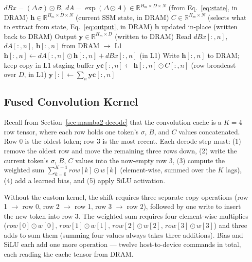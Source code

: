 \begin{algorithm}[h]
\caption{SSM update kernel (\texttt{ssm\_update})}
\label{alg:kernel}
\begin{algorithmic}[1]
\Require $\mathit{dBx} = (\Delta\,\sigma)\odot B,\ \mathit{dA} = \exp(\Delta\odot A) \in \mathbb{R}^{H_m \times D \times N}$ (from Eq.~\ref{eq:state}, in DRAM)
\Require $\mathbf{h} \in \mathbb{R}^{H_m \times D \times N}$ (current SSM state, in DRAM)
\Require $C \in \mathbb{R}^{H_m \times N}$ (selects what to extract from state, Eq.~\ref{eq:output}, in DRAM)
\Ensure  $\mathbf{h}$ updated in-place (written back to DRAM)
\Ensure  Output $\mathbf{y} \in \mathbb{R}^{H_m \times D}$ (written to DRAM)
\Statex
{}
                              
  \State Read $\mathit{dBx}[:,n]$, $\mathit{dA}[:,n]$, $\mathbf{h}[:,n]$ from DRAM $\to$ L1
  \State $\mathbf{h}[:,n] \leftarrow \mathit{dA}[:,n] \odot \mathbf{h}[:,n] + \mathit{dBx}[:,n]$ \hfill (in L1)
  \State Write $\mathbf{h}[:,n]$ to DRAM; keep copy in L1 staging buffer
\EndFor
{}                              
  \State $\mathbf{yc}[:,n] \leftarrow \mathbf{h}[:,n] \odot C[:,n]$ \hfill (row broadcast over $D$, in L1)
\EndFor
\State $\mathbf{y}[:] \leftarrow \sum_n \mathbf{yc}[:,n]$ 
\end{algorithmic}
\end{algorithm}

\subsection{Fused Convolution Kernel}
\label{sec:conv1d-kernel}

Recall from Section~\ref{sec:mamba2-decode} that the convolution cache is a $K{=}4$ row tensor, where each row holds one token's $\sigma$, $B$, and $C$ values concatenated. Row 0 is the oldest token; row 3 is the most recent. Each decode step must: (1) remove the oldest row and move the remaining three rows down, (2) write the current token's $\sigma$, $B$, $C$ values into the now-empty row 3, (3) compute the weighted sum $\sum_{k=0}^{K-1} \mathit{row}[k] \odot w[k]$ (element-wise, summed over the $K$ lags), (4) add a learned bias, and (5) apply SiLU activation.

Without the custom kernel, the shift requires three separate copy operations (row 1 $\to$ row 0, row 2 $\to$ row 1, row 3 $\to$ row 2), followed by one write to insert the new token into row 3. The weighted sum requires four element-wise multiplies ($\mathit{row}[0]\odot w[0]$, $\mathit{row}[1]\odot w[1]$, $\mathit{row}[2]\odot w[2]$, $\mathit{row}[3]\odot w[3]$) and three adds to sum them (summing four values always takes three additions). Bias and SiLU each add one more operation — twelve host-to-device commands in total, each reading the cache tensor from DRAM.

